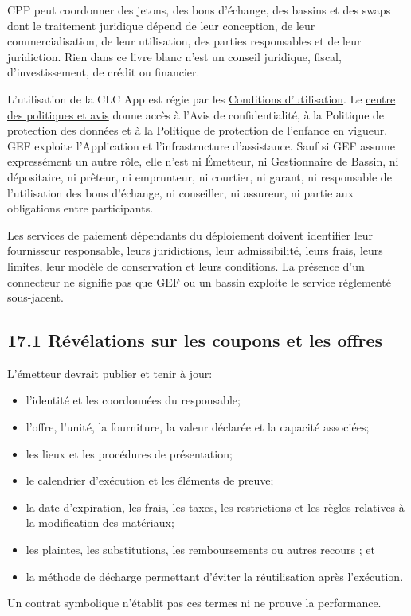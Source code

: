 \documentclass[11pt]{article}
\begin{document}
CPP peut coordonner des jetons, des bons d'échange, des bassins et des swaps dont le traitement juridique dépend de leur conception, de leur commercialisation, de leur utilisation, des parties responsables et de leur juridiction. Rien dans ce livre blanc n'est un conseil juridique, fiscal, d'investissement, de crédit ou financier.

L'utilisation de la CLC App est régie par les \href{https://docs.cosmolocal.credit/fr/governance/terms}{Conditions d'utilisation}. Le \href{https://docs.cosmolocal.credit/fr/governance/policies}{centre des politiques et avis} donne accès à l'Avis de confidentialité, à la Politique de protection des données et à la Politique de protection de l'enfance en vigueur. GEF exploite l'Application et l'infrastructure d'assistance. Sauf si GEF assume expressément un autre rôle, elle n'est ni Émetteur, ni Gestionnaire de Bassin, ni dépositaire, ni prêteur, ni emprunteur, ni courtier, ni garant, ni responsable de l'utilisation des bons d'échange, ni conseiller, ni assureur, ni partie aux obligations entre participants.

Les services de paiement dépendants du déploiement doivent identifier leur fournisseur responsable, leurs juridictions, leur admissibilité, leurs frais, leurs limites, leur modèle de conservation et leurs conditions. La présence d'un connecteur ne signifie pas que GEF ou un bassin exploite le service réglementé sous-jacent.

\subsection*{17.1 Révélations sur les coupons et les offres}

L'émetteur devrait publier et tenir à jour:

\begin{itemize}[leftmargin=*]
\item l'identité et les coordonnées du responsable;
\item l'offre, l'unité, la fourniture, la valeur déclarée et la capacité associées;
\item les lieux et les procédures de présentation;
\item le calendrier d'exécution et les éléments de preuve;
\item la date d'expiration, les frais, les taxes, les restrictions et les règles relatives à la modification des matériaux;
\item les plaintes, les substitutions, les remboursements ou autres recours ; et
\item la méthode de décharge permettant d'éviter la réutilisation après l'exécution.
\end{itemize}
Un contrat symbolique n'établit pas ces termes ni ne prouve la performance.
\end{document}
